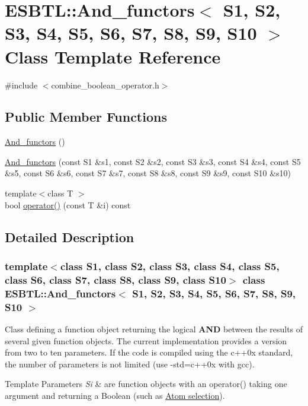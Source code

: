 \hypertarget{classESBTL_1_1And__functors}{}\section{E\+S\+B\+TL\+:\+:And\+\_\+functors$<$ S1, S2, S3, S4, S5, S6, S7, S8, S9, S10 $>$ Class Template Reference}
\label{classESBTL_1_1And__functors}


{\ttfamily \#include $<$combine\+\_\+boolean\+\_\+operator.\+h$>$}

\subsection*{Public Member Functions}
\begin{DoxyCompactItemize}
\item 
\hyperlink{classESBTL_1_1And__functors_a4d2fdf59b0ebe18373be38b7d73cd8af}{And\+\_\+functors} ()
\item 
\hyperlink{classESBTL_1_1And__functors_a885ebca7f3843786af31454418168cbb}{And\+\_\+functors} (const S1 \&s1, const S2 \&s2, const S3 \&s3, const S4 \&s4, const S5 \&s5, const S6 \&s6, const S7 \&s7, const S8 \&s8, const S9 \&s9, const S10 \&s10)
\item 
{\footnotesize template$<$class T $>$ }\\bool \hyperlink{classESBTL_1_1And__functors_aa612248c6e953a1ad6598b17ed3f8c80}{operator()} (const T \&i) const
\end{DoxyCompactItemize}


\subsection{Detailed Description}
\subsubsection*{template$<$class S1, class S2, class S3, class S4, class S5, class S6, class S7, class S8, class S9, class S10$>$\newline
class E\+S\+B\+T\+L\+::\+And\+\_\+functors$<$ S1, S2, S3, S4, S5, S6, S7, S8, S9, S10 $>$}

Class defining a function object returning the logical {\bfseries A\+ND} between the results of several given function objects. The current implementation provides a version from two to ten parameters. If the code is compiled using the c++0x standard, the number of parameters is not limited (use {\ttfamily -\/std=c++0x} with {\ttfamily gcc}). 
\begin{DoxyTemplParams}{Template Parameters}
{\em Si} & are function objects with an operator() taking one argument and returning a Boolean (such as \hyperlink{group__atomsel}{Atom selection}). \\
\hline
\end{DoxyTemplParams}



